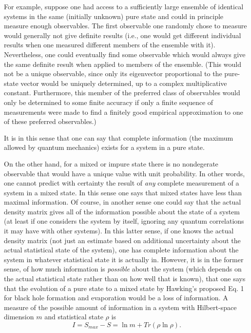      For example, suppose one had
access to a sufficiently large ensemble of identical systems in the
same
(initially
unknown) pure state and could in principle measure enough
observables.  The
first observable one randomly chose to measure would generally not
give
definite results (i.e., one would get different individual results
when one
measured different members of the ensemble with it).  Nevertheless,
one could
eventually find some observable which would always give the same
definite
result when applied to members of the ensemble.  (This would not be a
unique
observable, since only its eigenvector proportional to the pure-state
vector
would be uniquely determined, up to a complex multiplicative
constant.
Furthermore, this member of the preferred class of observables would
only
be determined to some finite accuracy if
only a finite sequence of measurements were made to find a finitely
good
empirical approximation to one of these preferred observables.)

    It is in this sense that
one can say that complete information (the maximum allowed by quantum
mechanics) exists for a system in a pure state.

     On the other hand, for a mixed or impure state there is no
nondegerate
observable that would have a unique value with unit probability.  In
other
words, one cannot predict with certainty the result of {\it any}
complete
measurement of a system in a mixed state.  In this sense one says
that mixed
states have less than maximal information.  Of course, in another
sense one
could say that the actual density matrix gives all of the information
possible
about the state of a system (at least if one considers the system by
itself,
ignoring any quantum correlations it may have with other systems).
In this
latter sense, if one knows the actual density matrix (not just an
estimate
based on additional uncertainty about the actual statistical state of
the
system), one has complete information about the system in whatever
statistical
state it is actually in.  However, it is in the former sense, of how
much
information is {\it possible} about the system (which depends on the
actual
statistical state rather than on how well that is known), that one
says that
the evolution of a pure state to a mixed state by Hawking's proposed
Eq. 1 for
black hole formation and evaporation would be a loss of information.
A measure
of the possible amount of information in a system with Hilbert-space
dimension
$m$ and statistical state $\rho$ is
     	\begin{equation}
	I = S_{max} - S=\ln m + Tr(\rho\ln\rho).
	\end{equation}

